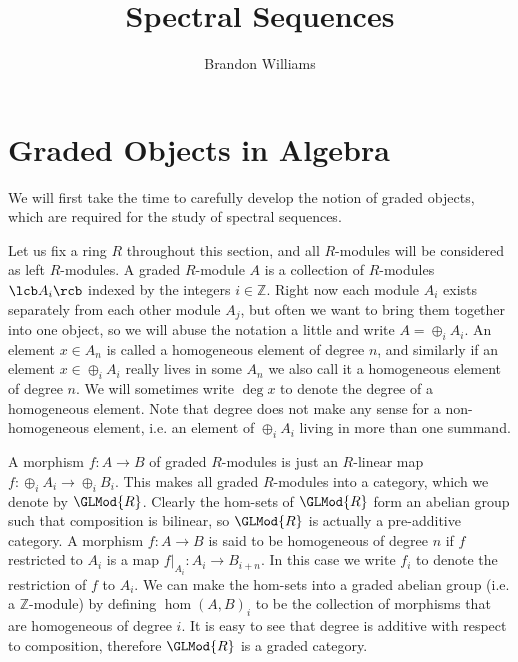 









\title{\Large Spectral Sequences}
\author{\large Brandon Williams}

\maketitle


\tableofcontents


\section{Graded Objects in Algebra}

We will first take the time to carefully develop the notion of graded objects, which are required for the study of spectral sequences.

Let us fix a ring $R$ throughout this section, and all $R$-modules will be considered as left $R$-modules. A graded $R$-module $A$ is a collection of $R$-modules $\lcb A_i \rcb$ indexed by the integers $i \in \mathbb Z$. Right now each module $A_i$ exists separately from each other module $A_j$, but often we want to bring them together into one object, so we will abuse the notation a little and write $A = \oplus_i A_i$. An element $x \in A_n$ is called a homogeneous element of degree $n$, and similarly if an element $x \in \oplus_i A_i$ really lives in some $A_n$ we also call it a homogeneous element of degree $n$. We will sometimes write $\deg x$ to denote the degree of a homogeneous element. Note that degree does not make any sense for a non-homogeneous element, i.e. an element of $\oplus_i A_i$ living in more than one summand.

A morphism $f : A \rightarrow B$ of graded $R$-modules is just an $R$-linear map $f : \oplus_i A_i \rightarrow \oplus_i B_i$. This makes all graded $R$-modules into a category, which we denote by $\GLMod{R}$. Clearly the hom-sets of $\GLMod{R}$ form an abelian group such that composition is bilinear, so $\GLMod{R}$ is actually a pre-additive category. A morphism $f : A \rightarrow B$ is said to be homogeneous of degree $n$ if $f$ restricted to $A_i$ is a map $f|_{A_i} : A_i \rightarrow B_{i+n}$. In this case we write $f_i$ to denote the restriction of $f$ to $A_i$. We can make the hom-sets into a graded abelian group (i.e. a $\mathbb Z$-module) by defining $\hom(A,B)_i$ to be the collection of morphisms that are homogeneous of degree $i$. It is easy to see that degree is additive with respect to composition, therefore $\GLMod{R}$ is a graded category.

